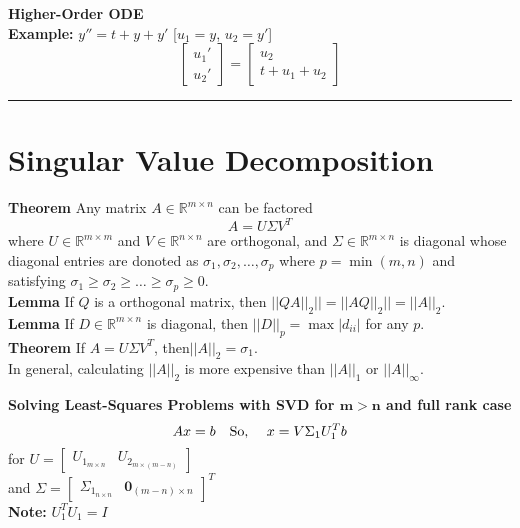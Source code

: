 \documentclass[9pt]{article}
\begin{document}
\begin{multicols}{3}
\vspace{0.05cm}
\textbf{Higher-Order ODE}\\
\textbf{Example: } $y'' = t + y + y'$ [$u_1 = y$, $u_2 = y'$]
\[
\begin{bmatrix}
    u_1'\\
    u_2'
\end{bmatrix}
=
\begin{bmatrix}
    u_2\\
    t+u_1+u_2
\end{bmatrix}
\]

\vspace{0.3cm}
\hrule

\vspace{-0.3cm}
\section{Singular Value Decomposition}

\textbf{Theorem} Any matrix $A \in \mathbb{R}^{m \times n}$ can be factored
\[
A = U \Sigma V^T
\]
where $U \in \mathbb{R}^{m \times m}$ and $V \in \mathbb{R}^{n \times n}$ are orthogonal, and $\Sigma \in \mathbb{R}^{m \times n}$ is diagonal whose diagonal entries are donoted as $\sigma_1, \sigma_2, \ldots, \sigma_p$ where $p = \min (m,n)$ and satisfying $\sigma_1 \geq \sigma_2 \geq \ldots \geq \sigma_p \geq 0.$\\

\textbf{Lemma} If $Q$ is a orthogonal matrix, then $||QA||_2 || =||AQ||_2 ||= ||A||_2$.\\

\textbf{Lemma} If $D \in \mathbb{R}^{m \times n}$ is diagonal, then $||D||_p = \max|d_{ii}|$ for any $p$.\\

\textbf{Theorem} If $A =U \Sigma V^T$, then$||A||_2 = \sigma_1.$\\
In general, calculating $||A||_2$ is more expensive than $||A||_1$ or $||A||_\infty$.   

\columnbreak
\textbf{Solving Least-Squares Problems with SVD for $\mathbf{m > n}$ and full rank case}
\[
Ax=b \quad \text{So, \quad} x = V \Sigma_1 U_1^Tb
\]
for $U =
\begin{bmatrix}
U_{1_{m \times n}}  & U_{2_{m \times (m-n)}}
\end{bmatrix}
$ \\
and $
\Sigma =
\begin{bmatrix}
    \Sigma_{1_{n \times n}} & \mathbf{0}_{(m-n) \times n}
\end{bmatrix}^T
$\\
\textbf{Note: } $U_1^TU_1 = I$


\end{multicols}
\end{document}
